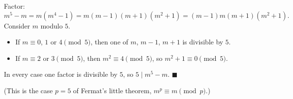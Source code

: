 Factor:
\[
m^5-m=m(m^4-1)=m(m-1)(m+1)(m^2+1)=(m-1)m(m+1)(m^2+1).
\]
Consider $m$ modulo $5$.
\begin{itemize}
\item If $m\equiv0$, $1$ or $4\pmod5$, then one of $m$, $m-1$, $m+1$ is divisible by $5$.
\item If $m\equiv2$ or $3\pmod5$, then $m^2\equiv4\pmod5$, so $m^2+1\equiv0\pmod5$.
\end{itemize}
In every case one factor is divisible by $5$, so $5\mid m^5-m$. $\blacksquare$

(This is the case $p=5$ of Fermat's little theorem, $m^p\equiv m\pmod p$.)
